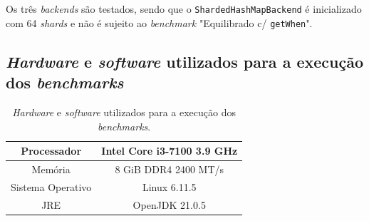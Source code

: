 \documentclass[11pt, a4paper]{article}
\begin{document}

Os três \emph{backends} são testados, sendo que o \texttt{ShardedHashMapBackend} é inicializado com
64 \emph{shards} e não é sujeito ao \emph{benchmark} "Equilibrado c/ \texttt{getWhen}"{}.

\subsection{\emph{Hardware} e \emph{software} utilizados para a execução dos \emph{benchmarks}}
\label{hardware-software-description}

\begin{table}[H]
    \begin{center}
        \begin{tabular}{|c|c|}
            \hline Processador       & Intel Core i3-7100 3.9 GHz  \\
            \hline Memória           & 8 GiB DDR4 2400 MT/s        \\
            \hline Sistema Operativo & Linux 6.11.5                \\
            \hline JRE               & OpenJDK 21.0.5              \\
            \hline
        \end{tabular}
    \end{center}

    \caption{\emph{Hardware} e \emph{software} utilizados para a execução dos \emph{benchmarks}.}
    \label{hardware-software}
\end{table}
\end{document}
